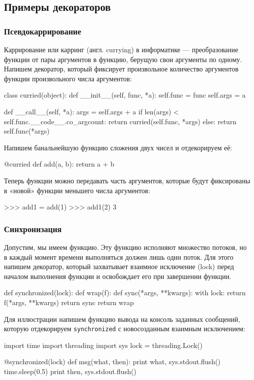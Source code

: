 \subsection{Примеры декораторов}
\subsubsection{Псевдокаррирование}
Каррирование или карринг (англ. currying) в информатике — преобразование функции от пары аргументов в функцию, берущую свои аргументы по одному. Напишем декоратор, который фиксирует произвольное количество аргументов функции произвольного числа аргументов:
\begin{pylst}{}{}
class curried(object):
    def __init__(self, func, *a):
        self.func = func
        self.args = a

    def __call__(self, *a):
        args = self.args + a
        if len(args) < self.func.__code__.co_argcount:
            return curried(self.func, *args)
        else:
            return self.func(*args)
\end{pylst}

Напишем банальнейшую функцию сложения двух чисел и отдекорируем её:
\begin{pylst}{}{}
@curried
def add(a, b):
    return a + b
\end{pylst}

Теперь функции можно передавать часть аргументов, которые будут фиксированы в «новой» функции меньшего числа аргументов:
\begin{pylst}{}{}
>>> add1 = add(1)
>>> add1(2)
3
\end{pylst}

\subsubsection{Синхронизация}
Допустим, мы имеем функцию. Эту функцию исполняют множество потоков, но в каждый момент времени выполняться должен лишь один поток. Для этого напишем декоратор, который захватывает взаимное исключение (lock) перед началом выполнения функции и освобождает его при завершении функции.
\begin{pylst}{}{}
def synchronized(lock):
    def wrap(f):
        def sync(*args, **kwargs):
            with lock:
                return f(*args, **kwargs)
        return sync
    return wrap
\end{pylst}

Для иллюстрации напишем функцию вывода на консоль заданных сообщений, которую отдекорируем \lstinline{synchronized} с новосозданным взаимным исключением:
\begin{pylst}{}{}
import time
import threading
import sys
lock = threading.Lock()

@synchronized(lock)
def msg(what, then):
    print what,
    sys.stdout.flush()
    time.sleep(0.5)
    print then,
    sys.stdout.flush()
\end{pylst}

